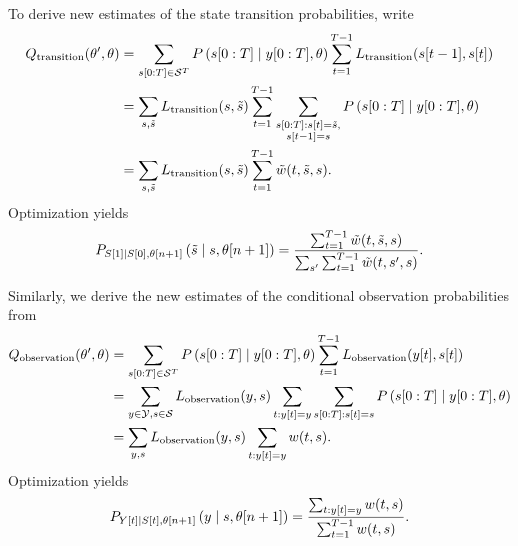 To derive new estimates of the state transition probabilities, write
\begin{align}
  Q_{\text{transition}} (\parameters',\parameters) &=
  \sum_{\ts{s}{0}{T}\in\states^T} P
  \left(\ts{s}{0}{T}\given \ts{y}{0}{T},\parameters \right) \sum_{t=1}^{T-1}
  L_{\text{transition}}(\ti{s}{t-1},\ti{s}{t})\\
  &= \sum_{s,{\tilde s}} L_{\text{transition}}(s,{\tilde s})
  \sum_{t=1}^{T-1} \sum_{\substack{\ts{s}{0}{T}:\ti{s}{t}={\tilde
        s},\\\ti{s}{t-1}=s}}
  P\left(\ts{s}{0}{T}\given \ts{y}{0}{T},\parameters \right)\\
  &= \sum_{s,{\tilde s}} L_{\text{transition}}(s,{\tilde s})
  \sum_{t=1}^{T-1} {\tilde w}(t,{\tilde s},s).
\end{align}
Optimization yields
\begin{equation}
  \label{eq:NewTrans}
  P_{{S}{[1]}\mid {S}{[0]},{\theta}{[n+1]}} \left({\tilde
      s}\mid s,{\theta}{[n+1]} \right) = \frac
  {\sum_{t=1}^{T-1} {\tilde w}(t,{\tilde s},s)} {\sum_{s'}
    \sum_{t=1}^{T-1} {\tilde w}(t,s',s)}.
\end{equation}

Similarly, we derive the new estimates of the conditional observation
probabilities from
\begin{align}
  \label{eq:Qout1}
  Q_{\text{observation}} (\parameters',\parameters) &=
  \sum_{\ts{s}{0}{T}\in\states^T} P
  \left(\ts{s}{0}{T}\given \ts{y}{0}{T},\parameters \right) \sum_{t=1}^{T-1}
  L_{\text{observation}}(\ti{y}{t},\ti{s}{t})\\
  &= \sum_{y\in\outputs,s\in\states} L_{\text{observation}}(y,s)
  \sum_{t:\ti{y}{t}=y}
  \sum_{\ts{s}{0}{T}:\ti{s}{t}=s }P
  \left(\ts{s}{0}{T}\given \ts{y}{0}{T},\parameters \right) \\
  &= \sum_{y,s} L_{\text{observation}}(y,s) \sum_{t:\ti{y}{t}=y} w(t,s).
\end{align}
Optimization yields
\begin{equation}
  \label{eq:NewOut}
  P_{{Y}{[t]}\mid {S}{[t]},{\theta}{[n+1]}}
  \left(y\mid s,{\theta}{[n+1]} \right) = \frac
  {\sum_{t:{y}{[t]}=y} w(t,s)} {\sum_{t=1}^{T-1} w(t,s)}.
\end{equation}

